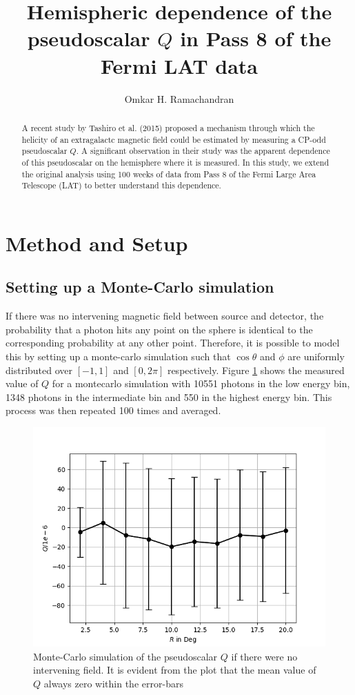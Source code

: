 \documentclass[english]{article}
\begin{document}
\title{Hemispheric dependence of the pseudoscalar $Q$ in Pass 8 of the Fermi LAT data}
\author{Omkar H. Ramachandran}

\maketitle

\begin{abstract}
A recent study by Tashiro et al. (2015) proposed a mechanism through which the 
helicity of an extragalactc magnetic field could be estimated by measuring
a CP-odd pseudoscalar $Q$.
A significant observation in their study was the apparent dependence of
this pseudoscalar on the hemisphere where it is measured. 
In this study, we extend the original analysis using 100 weeks of data from 
Pass 8 of the Fermi Large Area Telescope (LAT) to better understand this 
dependence.
\end{abstract}

\section{Method and Setup}
\subsection{Setting up a Monte-Carlo simulation}
If there was no intervening magnetic field between source and detector, the
probability that a photon hits any point on the sphere is identical to the
corresponding probability at any other point.
Therefore, it is possible to model this by setting up a monte-carlo simulation
such that $\cos \theta$ and $\phi$ are uniformly distributed over $[-1,1]$ and
$[0,2\pi]$ respectively.
Figure \ref{fig:montecarlo} shows the measured value of $Q$ for a montecarlo
simulation with 10551 photons in the low energy bin, 1348 photons in the 
intermediate bin and 550 in the highest energy bin. This process was then
repeated 100 times and averaged.
\begin{figure}
	\label{fig:montecarlo}
	\centering
	\includegraphics[scale=0.5]{montecarlo.png}
	\caption{Monte-Carlo simulation of the pseudoscalar $Q$ if there were no
	intervening field. It is evident from the plot that the mean value of $Q$
	always zero within the error-bars}
\end{figure}
\end{document}
